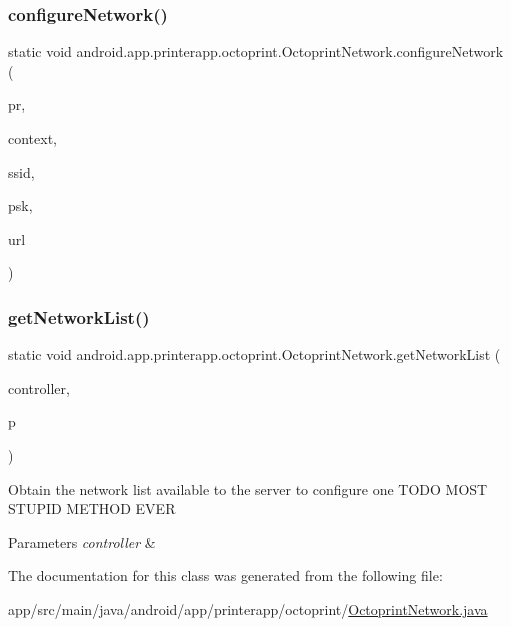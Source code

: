 \subsubsection{\texorpdfstring{configure\+Network()}{configureNetwork()}}
{\footnotesize\ttfamily static void android.\+app.\+printerapp.\+octoprint.\+Octoprint\+Network.\+configure\+Network (\begin{DoxyParamCaption}\item[{final \hyperlink{classandroid_1_1app_1_1printerapp_1_1devices_1_1discovery_1_1_print_network_receiver}{Print\+Network\+Receiver}}]{pr,  }\item[{final Context}]{context,  }\item[{String}]{ssid,  }\item[{String}]{psk,  }\item[{String}]{url }\end{DoxyParamCaption})\hspace{0.3cm}{\ttfamily [static]}}

\mbox{\label{classandroid_1_1app_1_1printerapp_1_1octoprint_1_1_octoprint_network_aa88423c674e83b62be857a6b30c44f94}} 
\subsubsection{\texorpdfstring{get\+Network\+List()}{getNetworkList()}}
{\footnotesize\ttfamily static void android.\+app.\+printerapp.\+octoprint.\+Octoprint\+Network.\+get\+Network\+List (\begin{DoxyParamCaption}\item[{final \hyperlink{classandroid_1_1app_1_1printerapp_1_1devices_1_1discovery_1_1_print_network_manager}{Print\+Network\+Manager}}]{controller,  }\item[{final \hyperlink{classandroid_1_1app_1_1printerapp_1_1model_1_1_model_printer}{Model\+Printer}}]{p }\end{DoxyParamCaption})\hspace{0.3cm}{\ttfamily [static]}}

Obtain the network list available to the server to configure one T\+O\+DO M\+O\+ST S\+T\+U\+P\+ID M\+E\+T\+H\+OD E\+V\+ER 
\begin{DoxyParams}{Parameters}
{\em controller} & \\
\hline
\end{DoxyParams}


The documentation for this class was generated from the following file\+:\begin{DoxyCompactItemize}
\item 
app/src/main/java/android/app/printerapp/octoprint/\hyperlink{_octoprint_network_8java}{Octoprint\+Network.\+java}\end{DoxyCompactItemize}
